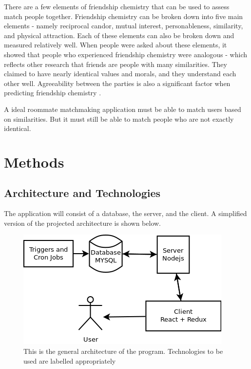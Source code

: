 \documentclass[journal]{./IEEE/IEEEtran}
\begin{document}
There are a few elements of friendship chemistry that can be used to assess match people together. Friendship chemistry can be broken down into five main elements - namely reciprocal candor, mutual interest, personableness, similarity, and physical attraction\cite{f_chemistry}. Each of these elements can also be broken down and measured relatively well. When people were asked about these elements, it showed that people who experienced friendship chemistry were analogous\cite{f_chemistry} - which reflects other research that friends are people with many similarities\cite{similar}. They claimed to have nearly identical values and morals, and they understand each other well\cite{f_chemistry}. Agreeability between the parties is also a significant factor when predicting friendship chemistry \cite{f_chemistry}.

A ideal roommate matchmaking application must be able to match users based on similarities. But it must still be able to match people who are not exactly identical.


\section{Methods}

\subsection{Architecture and Technologies}
The application will consist of a database, the server, and the client. A simplified version of the projected architecture is shown below.
\\
\begin{figure}[h]
\centering
\includegraphics[scale=0.5]{Architecture}
\caption{This is the general architecture of the program. Technologies to be used are labelled appropriately}
\end{figure}
\end{document}
